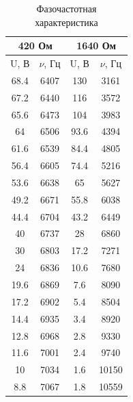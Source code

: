 \documentclass[a4paper,12 pt]{article}
\begin{document}
\begin{table}[]
    \centering
    \begin{tabular}{|c|c||c|c|}
    \hline
    \multicolumn{2}{|c||}{420 Ом} & \multicolumn{2}{c|}{1640 Ом}  \\
    \hline
    U, В & $\nu$, Гц & U, В & $\nu$, Гц \\
    \hline
         68.4  &  6407  &  130  &  3161 \\
\hline
67.2  &  6440  &  116  &  3572 \\
\hline
65.6  &  6473  &  104  &  3983 \\
\hline
64  &  6506  &  93.6  &  4394 \\
\hline
61.6  &  6539  &  84.4  &  4805 \\
\hline
56.4  &  6605  &  74.4  &  5216 \\
\hline
53.6  &  6638  &  65  &  5627 \\
\hline
49.2  &  6671  &  55.8  &  6038 \\
\hline
44.4  &  6704  &  43.2  &  6449 \\
\hline
40  &  6737  &  28  &  6860 \\
\hline
30  &  6803  &  17.2  &  7271 \\
\hline
24  &  6836  &  10.6  &  7680 \\
\hline
19.6  &  6869  &  7.6  &  8090 \\
\hline
17.2  &  6902  &  5.4  &  8504 \\
\hline
14.4  &  6935  &  3.4  &  8920 \\
\hline
12.8  &  6968  &  2.8  &  9330 \\
\hline
11.6  &  7001  &  2.4  &  9740 \\
\hline
10  &  7034  &  1.6  &  10150 \\
\hline
8.8  &  7067  &  1.8  &  10559 \\
\hline
    \end{tabular}
    \caption{Фазочастотная характеристика}
\end{table}
\end{document}
